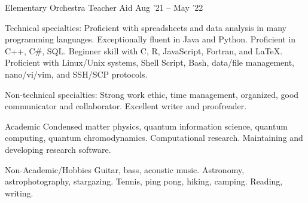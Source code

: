 \documentclass[11pt,a4paper]{article} %
\begin{document}
\headedsubsection
{Elementary Orchestra Teacher Aid}
{Aug '21 -- May '22}
{}

\spacedhrule{1.0em}{-0.4em}



\inlineheadsection %
{Technical specialties:}
{Proficient with spreadsheets and data analysis in many programming languages. Exceptionally fluent in Java and Python. Proficient in C++, C\#, SQL. Beginner skill with C, R, JavaScript, Fortran, and \LaTeX. Proficient with Linux/Unix systems, Shell Script, Bash, data/file management, nano/vi/vim, and SSH/SCP protocols.}

\inlineheadsection
{Non-technical specialties:}
{Strong work ethic, time management, organized, good communicator and collaborator. Excellent writer and proofreader.}

\spacedhrule{1.6em}{-0.4em} %



\inlineheadsection %
{Academic}
{Condensed matter physics, quantum information science, quantum computing, quantum chromodynamics. Computational research. Maintaining and developing research software.}

\inlineheadsection %
{Non-Academic/Hobbies}
{Guitar, bass, acoustic music. Astronomy, astrophotography, stargazing. Tennis, ping pong, hiking, camping. Reading, writing.}
\end{document}
